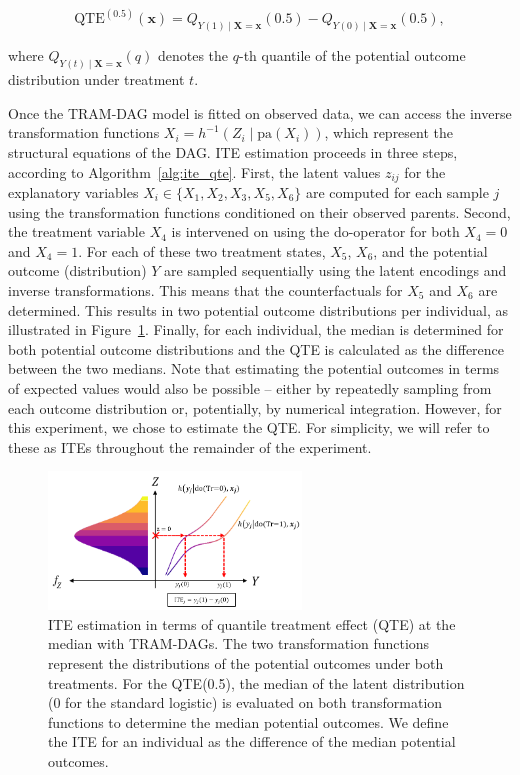 \begin{equation}
\text{QTE}^{(0.5)}(\mathbf{x}) = Q_{Y(1) \mid \mathbf{X} = \mathbf{x}}(0.5) - Q_{Y(0) \mid \mathbf{X} = \mathbf{x}}(0.5),
\label{eq:qte}
\end{equation}


where $Q_{Y(t) \mid \mathbf{X} = \mathbf{x}}(q)$ denotes the $q$-th quantile of the potential outcome distribution under treatment $t$.

Once the TRAM-DAG model is fitted on observed data, we can access the inverse transformation functions $X_i = h^{-1}(Z_i \mid \text{pa}(X_i))$, which represent the structural equations of the DAG. ITE estimation proceeds in three steps, according to Algorithm~\ref{alg:ite_qte}. First, the latent values $z_{ij}$ for the explanatory variables $X_i \in \{X_1, X_2, X_3, X_5, X_6\}$ are computed for each sample $j$ using the transformation functions conditioned on their observed parents. Second, the treatment variable $X_4$ is intervened on using the do-operator for both $X_4 = 0$ and $X_4 = 1$. For each of these two treatment states, $X_5$, $X_6$, and the potential outcome (distribution) $Y$ are sampled sequentially using the latent encodings and inverse transformations. This means that the counterfactuals for $X_5$ and $X_6$ are determined. This results in two potential outcome distributions per individual, as illustrated in Figure~\ref{fig:exp4_potential_outcomes}. Finally, for each individual, the median is determined for both potential outcome distributions and the QTE is calculated as the difference between the two medians. Note that estimating the potential outcomes in terms of expected values would also be possible -- either by repeatedly sampling from each outcome distribution or, potentially, by numerical integration. However, for this experiment, we chose to estimate the QTE. For simplicity, we will refer to these as ITEs throughout the remainder of the experiment.


\begin{figure}[H]
\centering
\includegraphics[width=0.6\textwidth]{img/potential_outcomes_y.png}
\caption{ITE estimation in terms of quantile treatment effect (QTE) at the median with TRAM-DAGs. The two transformation functions represent the distributions of the potential outcomes under both treatments. For the QTE(0.5), the median of the latent distribution (0 for the standard logistic) is evaluated on both transformation functions to determine the median potential outcomes. We define the ITE for an individual as the difference of the median potential outcomes.}
\label{fig:exp4_potential_outcomes}
\end{figure}



